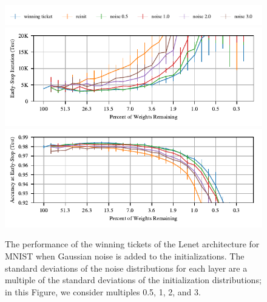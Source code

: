 \begin{figure}
\centering
\includegraphics[width=.8\textwidth]{graphs/mnist/lenet/noise/legend}
\includegraphics[width=.5\textwidth]{graphs/mnist/lenet/noise/iteration}%
\includegraphics[width=.5\textwidth]{graphs/mnist/lenet/noise/accuracy}
\caption{The performance of the winning tickets of the Lenet architecture for MNIST when Gaussian noise is added to the initializations. The standard deviations of
the noise distributions for each layer are a multiple of the standard deviations of the initialization distributions; in this Figure, we consider multiples 0.5, 1, 2, and 3.}
\label{fig:adam-noise}
\end{figure}